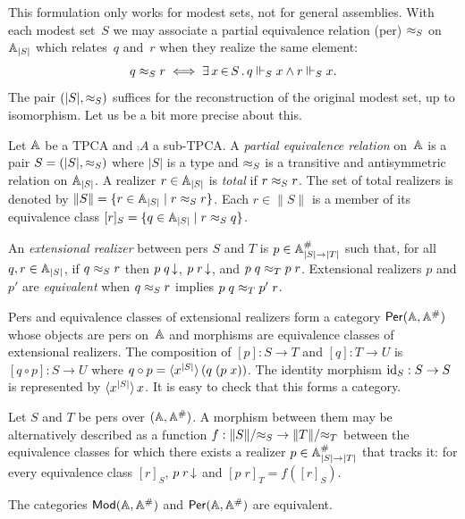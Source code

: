 This formulation only works for modest sets, not for general
assemblies. With each modest set~$S$ we may associate a partial
equivalence relation (per) $\per_S$ on
$\xAtyp{S}$ which relates~$q$ and~$r$ when they realize the same
element:
%
\begin{equation*}
  q \per_S r \iff
  \xsome{x}{S}{q \rz_S x \land r \rz_S x}.
\end{equation*}
%
The pair $(|S|, {\per_S})$ suffices for the reconstruction of the
original modest set, up to isomorphism. Let us be a bit more precise
about this.

Let $\AA$ be a TPCA and $\comp{A}$ a sub-TPCA. A \emph{partial
  equivalence relation} on~$\AA$ is a pair $S = (|S|, {\per_S})$ where
$|S|$ is a type and $\per_S$ is a transitive and antisymmetric
relation on $\xAtyp{S}$. A realizer $r \in \xAtyp{S}$ is \emph{total} if
$r \per_S r$. The set of total realizers is denoted by $\|S\| = \set{r
  \in \xAtyp{S} \such r \per_S r}$. Each $r \in \|S\|$ is a member of
its equivalence class $[r]_S = \set{q \in \xAtyp{S} \such r \per_S q}$.

An \emph{extensional realizer} between pers $S$ and $T$ is $p \in
\compAtyp{|S| \to |T|}$ such that, for all $q, r \in \xAtyp{S}$, if $q
\per_S r$ then $\defined{p\;q}$, $\defined{p\;r}$, and $p\;q \per_T
p\;r$. Extensional realizers $p$ and $p'$ are \emph{equivalent} when
$q \per_S r$ implies $p\;q \per_T p'\;r$.

Pers and equivalence classes of extensional realizers form a category
$\Per{\AA, \compAA}$ whose objects are pers on~$\AA$ and morphisms are
equivalence classes of extensional realizers. The composition of $[p]
: S \to T$ and $[q] : T \to U$ is $[q \circ p] : S \to U$ where $q
\circ p = \pcalam{\annot{x}{|S|}}{q\;(p\;x)}$. The identity morphism
$\id_S : S \to S$ is represented by $\xpcalam{\annot{x}{|S|}}{x}$. It
is easy to check that this forms a category.

Let $S$ and $T$ be pers over $(\AA, \compAA)$. A morphism between them
may be alternatively described as a function $f : \|S\|/{\per_S} \to
\|T\|/{\per_T}$ between the equivalence classes for which there exists
a realizer $p \in \compAtyp{|S| \to |T|}$ that tracks it: for every
equivalence class $[r]_S$, $\defined{p\;r}$ and $[p\;r]_T = f([r]_S)$.

\begin{proposition}
  The categories $\Mod{\AA, \compAA}$ and $\Per{\AA, \compAA}$ are
  equivalent.
\end{proposition}

